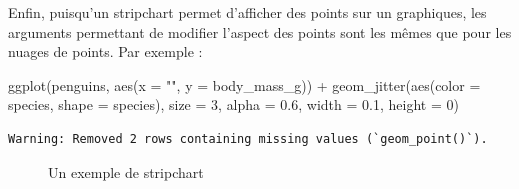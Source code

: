 \documentclass[
  a4paper,
  DIV=11,
  numbers=noendperiod,
  oneside]{scrreprt}
\newenvironment{Shaded}{}{}
\newcommand{\AttributeTok}[1]{\textcolor[rgb]{0.84,0.23,0.29}{#1}}
\newcommand{\DecValTok}[1]{\textcolor[rgb]{0.00,0.36,0.77}{#1}}
\newcommand{\FloatTok}[1]{\textcolor[rgb]{0.00,0.36,0.77}{#1}}
\newcommand{\FunctionTok}[1]{\textcolor[rgb]{0.44,0.26,0.76}{#1}}
\newcommand{\NormalTok}[1]{\textcolor[rgb]{0.14,0.16,0.18}{#1}}
\newcommand{\SpecialCharTok}[1]{\textcolor[rgb]{0.00,0.36,0.77}{#1}}
\newcommand{\StringTok}[1]{\textcolor[rgb]{0.01,0.18,0.38}{#1}}
\begin{document}
Enfin, puisqu'un stripchart permet d'afficher des points sur un
graphiques, les arguments permettant de modifier l'aspect des points
sont les mêmes que pour les nuages de points. Par exemple :

\begin{Shaded}
\begin{Highlighting}[]
\FunctionTok{ggplot}\NormalTok{(penguins, }\FunctionTok{aes}\NormalTok{(}\AttributeTok{x =} \StringTok{""}\NormalTok{, }\AttributeTok{y =}\NormalTok{ body\_mass\_g)) }\SpecialCharTok{+}
  \FunctionTok{geom\_jitter}\NormalTok{(}\FunctionTok{aes}\NormalTok{(}\AttributeTok{color =}\NormalTok{ species, }\AttributeTok{shape =}\NormalTok{ species),}
              \AttributeTok{size =} \DecValTok{3}\NormalTok{, }\AttributeTok{alpha =} \FloatTok{0.6}\NormalTok{, }
              \AttributeTok{width =} \FloatTok{0.1}\NormalTok{, }\AttributeTok{height =} \DecValTok{0}\NormalTok{)}
\end{Highlighting}
\end{Shaded}

\begin{verbatim}
Warning: Removed 2 rows containing missing values (`geom_point()`).
\end{verbatim}

\begin{figure}[H]


\caption{\label{fig-strip}Un exemple de stripchart}

\end{figure}%
\end{document}
